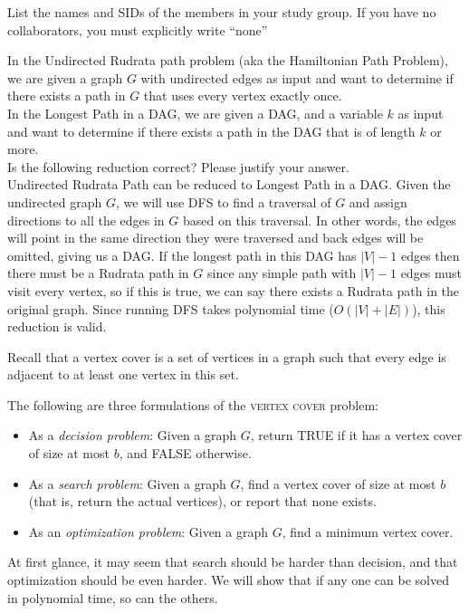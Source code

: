 List the names and SIDs of the members in your study group.
If you have no collaborators, you must explicitly write ``none''


\noindent In the Undirected Rudrata path problem (aka the Hamiltonian Path Problem), we are given a graph $G$ with undirected edges
as input and want to determine if there exists a path in $G$ that uses every vertex exactly once. \\

\noindent In the Longest Path in a DAG, we are given a DAG, and a variable $k$
as input and want to determine if there exists a path in the DAG that is of length $k$ or more. \\

\noindent Is the following reduction correct? Please justify your answer.\\

\noindent Undirected Rudrata Path can be reduced to Longest Path in a DAG. Given the undirected graph $G$, we will use DFS to find a traversal of $G$
and assign directions to all the edges in $G$ based on this traversal. In other words, the edges will point in the same direction they were traversed and back
edges will be omitted, giving us a DAG. If the longest path in this DAG has $|V| - 1$ edges then there must be a Rudrata path in $G$ since any simple
path with $|V| - 1$ edges must visit every vertex, so if this is true, we can say there exists a Rudrata path in the original graph.
Since running DFS takes polynomial time ($O(|V| + |E|)$), this reduction is valid.



	Recall that a vertex cover is a set of vertices in a graph such that every edge is adjacent to at least one vertex in this set.

	The following are three formulations of the \textsc{vertex cover} problem:
	\begin{itemize}
		\item As a \textit{decision problem}: Given a graph $G$, return TRUE if it has a vertex cover of size at most $b$, and FALSE otherwise.
		\item As a \textit{search problem}: Given a graph $G$, find a vertex cover of size at most $b$ (that is, return the actual vertices), or report that none exists.
		\item As an \textit{optimization problem}: Given a graph $G$, find a minimum vertex cover. \\
	\end{itemize}
	At first glance, it may seem that search should be harder than decision, and that optimization should be even harder. We will show that if any one can be solved in polynomial time, so can the others.

